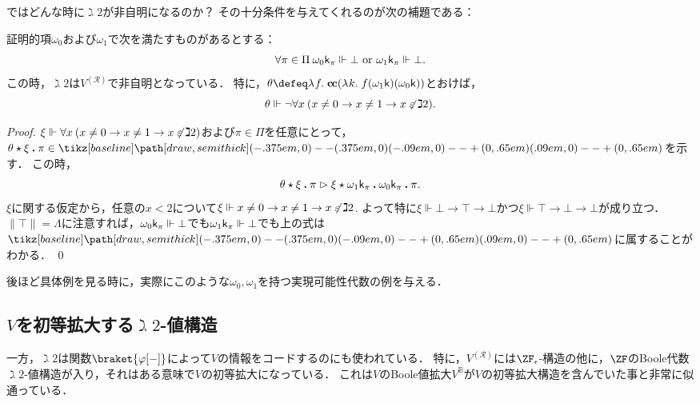 \documentclass[realisability.tex]{subfiles}
\begin{document}
ではどんな時に$\gimel 2$が非自明になるのか？
その十分条件を与えてくれるのが次の補題である：

\begin{lemma}\label{lem:char-ba-nontriv}
 証明的項$\omega_0$および$\omega_1$で次を満たすものがあるとする：
 \[
  \forall \pi \in \Pi \: \omega_0 \mathsf{k}_\pi \Vdash \bot \text{ or } \omega_1 \mathsf{k}_\pi \Vdash \bot.
 \]
 この時，$\gimel 2$は$V^{(\mathcal{R})}$で非自明となっている．
 特に，$\theta \defeq \abs{f}{\cc (\abs{k}{f(\omega_1 \conti)(\omega_0 \conti)})}$とおけば，
 \[
  \theta \Vdash \neg \forall x \: (x \neq 0 \to x \neq 1 \to x \not\mathrel{\varepsilon} \gimel 2).
 \]
\end{lemma}
\begin{proof}
 $\xi \Vdash \forall x \: (x \neq 0 \to x \neq 1 \to x \not\mathrel{\varepsilon} \gimel 2)$および$\pi \in \Pi$を任意にとって，$\theta \cons \xi \push \pi\in \pole$を示す．
 この時，
 \[
  {\theta \mathbin{\star} \xi \mathbin{\boldsymbol{.}} \pi}
  \mathrel{\rhd} {\xi \mathbin{\star} {\omega_1 \mathsf{k}_{\pi}} \mathbin{\boldsymbol{.}} {\omega_0 \mathsf{k}_{\pi}} \mathbin{\boldsymbol{.}} \pi}.
 \]
 $\xi$に関する仮定から，任意の$x < 2$について$\xi \Vdash x \neq 0 \to x \neq 1 \to x \not\mathrel{\varepsilon} \gimel 2$.
 よって特に$\xi \Vdash \bot \to \top \to \bot$かつ$\xi \Vdash \top \to \bot \to \bot$が成り立つ．
 $\|\top\| = \Lambda$に注意すれば，$\omega_0 \mathsf{k}_\pi \Vdash \bot$でも$\omega_1 \mathsf{k}_\pi \Vdash \bot$でも上の式は$\pole$に属することがわかる． \qed
\end{proof}
後ほど具体例を見る時に，実際にこのような$\omega_0, \omega_1$を持つ実現可能性代数の例を与える．

\subsection{$V$を初等拡大する$\gimel 2$-値構造}
一方，$\gimel 2$は関数$\braket{ \varphi[-] }$によって$V$の情報をコードするのにも使われている．
特に，$V^{(\mathcal{R})}$には$\ZF_{\epsilon}$-構造の他に，$\ZF$のBoole代数$\gimel 2$-値構造が入り，それはある意味で$V$の初等拡大になっている．
これは$V$のBoole値拡大$V^{\mathbb{B}}$が$V$の初等拡大構造を含んでいた事と非常に似通っている．
\end{document}
